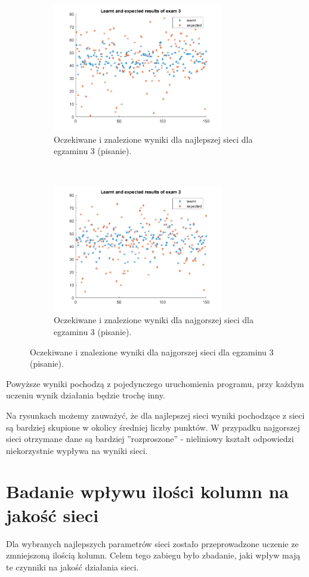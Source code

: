\documentclass[12pt]{article}
\begin{document}
\begin{figure}[H]
\begin{subfigure}[t]{0.48\textwidth} 
\centering
\includegraphics[height=2.2in]{best_results_3.png}
\caption{Oczekiwane i znalezione wyniki dla najlepszej sieci dla egzaminu 3 (pisanie).}
\end{subfigure}
~~
\begin{subfigure}[t]{0.48\textwidth} 
\centering
\includegraphics[height=2.2in]{worst_exam_3.png}
\caption{Oczekiwane i znalezione wyniki dla najgorszej sieci dla egzaminu 3 (pisanie).}
\end{subfigure}
\end{figure}

Powyższe wyniki pochodzą z pojedynczego uruchomienia programu, przy każdym uczeniu wynik działania będzie trochę inny. 

Na rysunkach możemy zauważyć, że dla najlepszej sieci wyniki pochodzące z sieci są bardziej skupione w okolicy średniej liczby punktów. W przypadku najgorszej sieci otrzymane dane są bardziej ''rozproszone'' -  nieliniowy kształt odpowiedzi niekorzystnie wypływa na wyniki sieci.

\pagebreak
\section{Badanie wpływu ilości kolumn na jakość sieci}

Dla wybranych najlepszych parametrów sieci zostało przeprowadzone uczenie ze zmniejszoną ilością kolumn. Celem tego zabiegu było zbadanie, jaki wpływ mają te czynniki na jakość działania sieci. 
\end{document}
